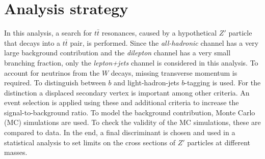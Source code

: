 \section{Analysis strategy}
\label{sec:Durchführung}
In this analysis, a search for $t\bar{t}$ resonances, caused by a hypothetical $Z\prime$ particle that decays into a $t\bar{t}$ pair, is performed. Since the \textit{all-hadronic} channel has a very large background contribution and the \textit{dilepton} channel has a very small branching fraction, only the \textit{lepton+jets} channel is considered in this analysis.
To account for neutrinos from the $W$ decays, missing transverse momentum is required. To distinguish between $b$ and light-hadron-jets
$b$-tagging is used. For the distinction a displaced secondary vertex is important among other criteria.
An event selection is applied using these and additional criteria to increase the signal-to-background ratio.
To model the background contribution, Monte Carlo (MC) simulations are used.
To check the validity of the MC simulations, these are compared to data. In the end, a final discriminant is chosen and used in a statistical analysis to set limits on the cross sections of $Z\prime$ particles at different masses.
